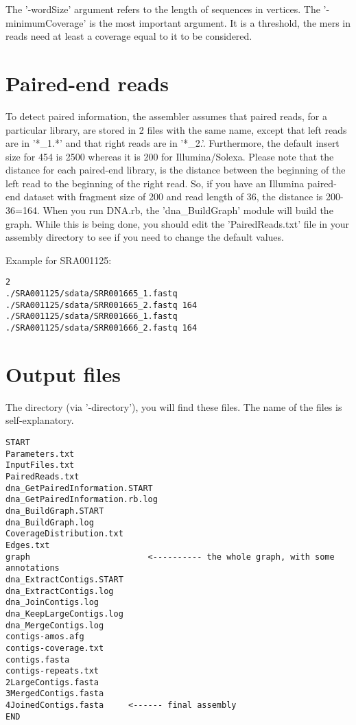 \documentclass{article}
\begin{document}
The '-wordSize' argument refers to the length of sequences in vertices. The '-minimumCoverage' is the most important argument.
It is a threshold, the mers in reads need at least a coverage equal to it to be considered.
\section{Paired-end reads}

To detect paired information, the assembler assumes that paired reads, for a particular library, are stored in 2 files with the same name, except that left reads
are in '*\_1.*' and that right reads are in '*\_2.'.
Furthermore, the default insert size for 454 is 2500 whereas it is 200 for Illumina/Solexa.
Please note that the distance for each paired-end library, is the distance between the beginning of the left read to the beginning of the right read.
So, if you have an Illumina paired-end dataset with fragment size of 200 and read length of 36, the distance
is 200-36=164.
When you run DNA.rb, the 'dna\_BuildGraph' module will build the graph. While this is being done, you should edit
the 'PairedReads.txt' file in your assembly directory to see if you need to change the default values.

Example for SRA001125:

\begin{verbatim}
2
./SRA001125/sdata/SRR001665_1.fastq ./SRA001125/sdata/SRR001665_2.fastq 164
./SRA001125/sdata/SRR001666_1.fastq ./SRA001125/sdata/SRR001666_2.fastq 164
\end{verbatim}

\section{Output files}

The directory (via '-directory'), you will find these files.
The name of the files is self-explanatory.

\begin{verbatim}
START
Parameters.txt
InputFiles.txt
PairedReads.txt
dna_GetPairedInformation.START
dna_GetPairedInformation.rb.log
dna_BuildGraph.START
dna_BuildGraph.log
CoverageDistribution.txt
Edges.txt
graph                        <---------- the whole graph, with some annotations
dna_ExtractContigs.START
dna_ExtractContigs.log
dna_JoinContigs.log
dna_KeepLargeContigs.log
dna_MergeContigs.log
contigs-amos.afg
contigs-coverage.txt
contigs.fasta
contigs-repeats.txt
2LargeContigs.fasta
3MergedContigs.fasta
4JoinedContigs.fasta     <------ final assembly
END
\end{verbatim}
\end{document}
